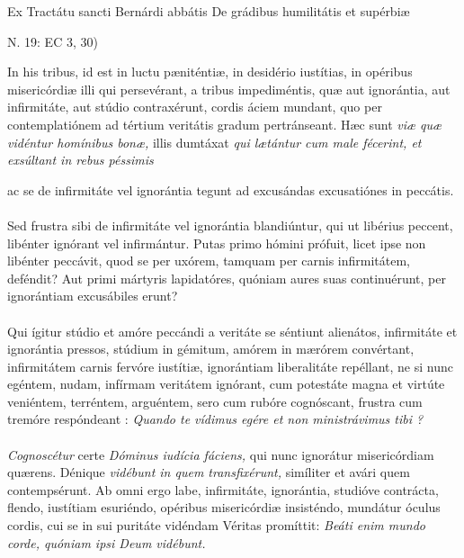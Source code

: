 \documentclass[options]{article}
\begin{document}
	Ex Tractátu sancti Bernárdi abbátis De grádibus humilitátis et supérbiæ
	\begin{flushright}
		N. 19: EC 3, 30)
	\end{flushright}
In his tribus, id est in luctu pæniténtiæ, in desidério iustítias, in opéribus misericórdiæ illi qui persevérant, a tribus impediméntis, quæ aut ignorántia, aut infirmitáte, aut stúdio contraxérunt, cordis áciem mundant, quo per contemplatiónem ad tértium veritátis gradum pertránseant. Hæc sunt 
\emph{viæ quæ vidéntur homínibus bonæ,}
illis dumtáxat
\emph{qui lætántur cum male fécerint, et exsúltant in rebus péssimis}



ac se de infirmitáte vel ignorántia tegunt ad excusándas excusatiónes in peccátis.\\
\\
Sed frustra sibi de infirmitáte vel ignorántia blandiúntur, qui ut libérius peccent, libénter ignórant vel infirmántur. Putas primo hómini prófuit, licet ipse non libénter peccávit, quod se per uxórem, tamquam per carnis infirmitátem, deféndit? Aut primi mártyris lapidatóres, quóniam aures suas continuérunt, per ignorántiam excusábiles erunt? \\
\\
Qui ígitur stúdio et amóre peccándi a veritáte se séntiunt alienátos, infirmitáte et ignorántia pressos, stúdium in gémitum, amórem in mærórem convértant, infirmitátem carnis fervóre iustítiæ, ignorántiam liberalitáte repéllant, ne si nunc egéntem, nudam, infírmam veritátem ignórant, cum potestáte magna et virtúte veniéntem, terréntem, arguéntem, sero cum rubóre cognóscant, frustra cum tremóre respóndeant : 
\emph{Quando te vídimus egére et non ministrávimus tibi ?}\\
\\
\emph{Cognoscétur}
certe
\emph{Dóminus iudícia fáciens,}
 qui nunc ignorátur misericórdiam quærens. Dénique
 \emph{vidébunt in quem transfixérunt,}
  simíliter et avári quem contempsérunt. Ab omni ergo labe, infirmitáte, ignorántia, studióve contrácta, flendo, iustítiam esuriéndo, opéribus misericórdiæ insisténdo, mundátur óculus cordis, cui se in sui puritáte vidéndam Véritas promíttit: 
  \emph{Beáti enim mundo corde, quóniam ipsi Deum vidébunt.}
  
  
\end{document}
